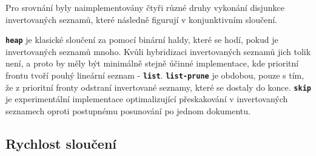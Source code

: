 \documentclass[11pt,letterpaper,oneside,openright]{book}
\newcommand{\bftt}[1]{\texttt{\textbf{#1}}}
\begin{document}
Pro srovnání byly naimplementovány čtyři různé druhy vykonání disjunkce
invertovaných seznamů, které následně figurují v konjunktivním sloučení.

\bftt{heap} je klasické sloučení za pomocí binární haldy, které se hodí, pokud
je invertovaných seznamů mnoho. Kvůli hybridizaci invertovaných seznamů jich
tolik není, a proto by měly být minimálně stejně účinné implementace, kde
prioritní frontu tvoří pouhý lineární seznam - \bftt{list}. \bftt{list-prune}
je obdobou, pouze s tím, že z prioritní fronty odstraní invertované seznamy,
které se dostaly do konce. \bftt{skip} je experimentální implementace
optimalizující přeskakování v invertovaných seznamech oproti postupnému
posunování po jednom dokumentu.


\subsection{Rychlost sloučení}
\end{document}

